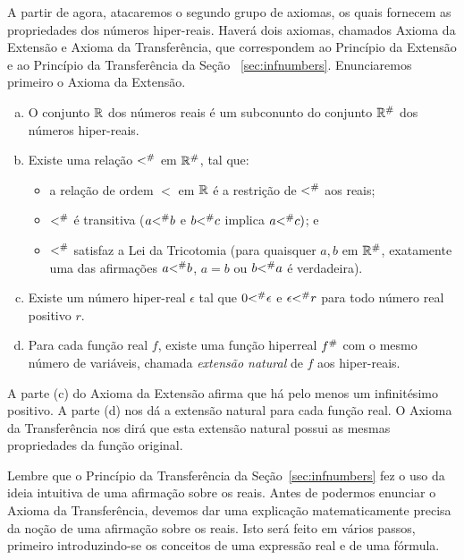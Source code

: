 \documentclass{svmono}
\begin{document}
A partir de agora, atacaremos o segundo grupo de axiomas, os quais
fornecem as propriedades dos números hiper-reais. Haverá dois axiomas,
chamados Axioma da Extensão e Axioma da Transferência, que correspondem
ao Princípio da Extensão e ao Princípio da Transferência da Seção%
~\ref{sec:infnumbers}. Enunciaremos primeiro o Axioma da Extensão.


\begin{enumerate}[(a)]
\item O conjunto $\mathbb{R}$ dos números reais é um subconunto do conjunto
      ${\mathbb{R}}^\#$ dos números hiper-reais.
\item Existe uma relação ${<}^\#$ em ${\mathbb{R}}^\#$, tal que:
      \begin{itemize}
      \item a relação de ordem $<$ em $\mathbb{R}$ é a restrição de ${<}^\#$
            aos reais;
      \item ${<}^\#$ é transitiva ($a {<}^\# b$ e $b {<}^\# c$ implica $a {<}^\# c)$; e
      \item ${<}^\#$ satisfaz a Lei da Tricotomia (para quaisquer $a,b$ em ${\mathbb{R}}^\#$, exatamente uma das afirmações $a {<}^\# b$, $a = b$ ou $b {<}^\# a$ é verdadeira).
      \end{itemize}
\item Existe um número hiper-real $\epsilon$ tal que $0 {<}^\# \epsilon$ e
      $\epsilon {<}^\# r$ para todo número real positivo $r$.
\item Para cada função real $f$, existe uma função hiperreal ${f}^\#$
      com o mesmo número de variáveis, chamada \emph{extensão natural}
      de $f$ aos hiper-reais.
\end{enumerate}

A parte (c) do Axioma da Extensão afirma que há pelo menos um infinitésimo
positivo. A parte (d) nos dá a extensão natural para cada função real.
O Axioma da Transferência nos dirá que esta extensão natural possui as
mesmas propriedades da função original.

Lembre que o Princípio da Transferência da Seção~\ref{sec:infnumbers} fez
o uso da ideia intuitiva de uma afirmação sobre os reais. Antes de podermos
enunciar o Axioma da Transferência, devemos dar uma explicação matematicamente
precisa da noção de uma afirmação sobre os reais. Isto será feito em
vários passos, primeiro introduzindo-se os conceitos de uma expressão
real e de uma fórmula.
\end{document}
